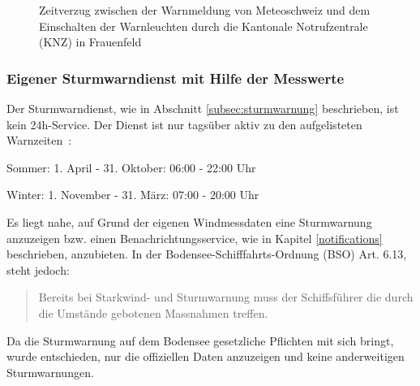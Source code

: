 \begin{figure}[h!]
	\centering
	\caption[Zeitverzug zwischen Sturmwarnmeldung und Anzeige]{Zeitverzug zwischen der Warnmeldung von Meteoschweiz und dem Einschalten der Warnleuchten durch die Kantonale Notrufzentrale (KNZ) in Frauenfeld}
	\label{img:sturmZeit}
\end{figure}


\subsubsection{Eigener Sturmwarndienst mit Hilfe der Messwerte}
Der Sturmwarndienst, wie in Abschnitt \ref{subsec:sturmwarnung} beschrieben, ist kein 24h-Service. Der Dienst ist nur tagsüber aktiv zu den aufgelisteten Warnzeiten~\cite{kapoStwrn}:

\begin{description*}
  \item[Sommer:] 1. April - 31. Oktober: 06:00 - 22:00 Uhr
  \item[Winter: ] 1. November - 31. März: 07:00 - 20:00 Uhr
\end{description*}

\noindent
Es liegt nahe, auf Grund der eigenen Windmessdaten eine Sturmwarnung anzuzeigen bzw. einen Benachrichtungsservice, wie in Kapitel \ref{notifications} beschrieben, anzubieten. In der Bodensee-Schifffahrts-Ordnung (BSO) Art. 6.13, steht jedoch:

\begin{quote}
\flqq Bereits bei Starkwind- und Sturmwarnung muss der Schiffsführer die durch die Umstände gebotenen Massnahmen treffen.\frqq
\end{quote}

\noindent
 Da die Sturmwarnung auf dem Bodensee gesetzliche Pflichten mit sich bringt, wurde entschieden, nur die offiziellen Daten anzuzeigen und keine anderweitigen Sturmwarnungen.

